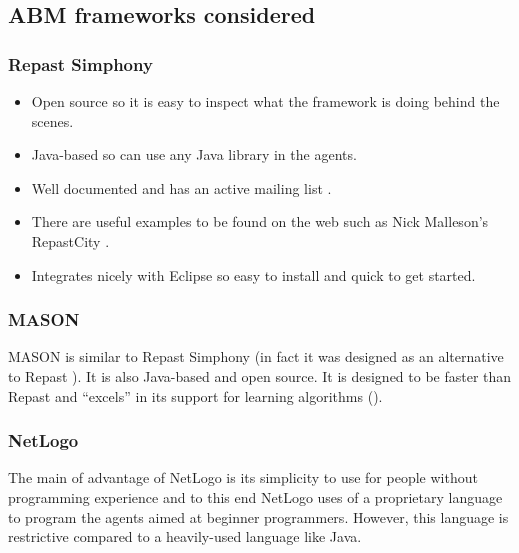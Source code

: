     \subsection{ABM frameworks considered}
    \subsubsection{Repast Simphony}
    \begin{itemize}
      \item Open source so it is easy to inspect what the framework is doing behind the scenes.
      \item Java-based so can use any Java library in the agents.
      \item Well documented and has an active mailing list \cite{Repast}.
      \item There are useful examples to be found on the web such as Nick Malleson's RepastCity \cite{Malleson}.
      \item Integrates nicely with Eclipse so easy to install and quick to get started.
    \end{itemize}    
        
    \subsubsection{MASON}
    MASON is similar to Repast Simphony (in fact it was designed as an alternative to Repast \cite{Allan2009}). It is also Java-based and open source. It is designed to be faster than Repast and ``excels'' in its support for learning algorithms (\cite{Berryman2008}).
      
    \subsubsection{NetLogo}
    The main of advantage of NetLogo is its simplicity to use for people without programming experience and to this end NetLogo uses of a proprietary language to program the agents aimed at beginner programmers. However, this language is restrictive compared to a heavily-used language like Java.
    
